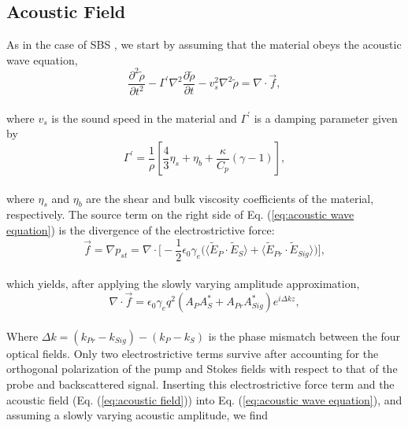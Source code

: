 \documentclass[%
  reprint,
  superscriptaddress,
  amsmath,amssymb,
  aps,
  prapplied,
]{revtex4-2}
\begin{document}
\subsection{Acoustic Field}
\label{Coupled-Wave Equations:Acoustic Field}

As in the case of SBS \cite{boyd2020nonlinear}, we start by assuming that the material obeys the acoustic wave equation,
\\
\begin{equation}
    \frac{\partial^{2}\tilde{\rho}}{\partial t^{2}} - \Gamma^{\prime}\nabla^{2}\frac{\partial\tilde{\rho}}{\partial t} - v_{s}^{2}\nabla^{2}\tilde{\rho} = \nabla\cdot\vec{f},
    \label{eq:acoustic wave equation}
\end{equation}
\\
\noindent where $v_{s}$ is the sound speed in the material and $\Gamma^{\prime}$ is a damping parameter given by
\\
\begin{equation}
    \Gamma^{\prime} = \frac{1}{\rho}\left[\frac{4}{3}\eta_{s} + \eta_{b} + \frac{\kappa}{C_{p}}(\gamma - 1)\right],
\end{equation}
\\
\noindent where $\eta_{s}$ and $\eta_{b}$ are the shear and bulk viscosity coefficients of the material, respectively. The source term on the right side of Eq. (\ref{eq:acoustic wave equation}) is the divergence of the electrostrictive force:
\\
\begin{equation}
    \vec{f} = \nabla p_{st} = \nabla \cdot \Bigg[-\frac{1}{2}\epsilon_{0}\gamma_{e}\Big(\langle\tilde{E}_{P} \cdot \tilde{E}_{S}\rangle + \langle\tilde{E}_{Pr} \cdot \tilde{E}_{Sig}\rangle\Big)\Bigg],
\end{equation}
\\
which yields, after applying the slowly varying amplitude approximation,
\\
\begin{equation}
    \nabla\cdot\vec{f} = \epsilon_{0}\gamma_{e}q^{2}(A_{P}A_{S}^{*} + A_{Pr}A_{Sig}^{*})e^{i\Delta kz},
\end{equation}
\\
Where $\Delta k = (k_{Pr} - k_{Sig}) - (k_{P} - k_{S})$ is the phase mismatch between the four optical fields. Only two electrostrictive terms survive after accounting for the orthogonal polarization of the pump and Stokes fields with respect to that of the probe and backscattered signal. Inserting this electrostrictive force term and the acoustic field (Eq. (\ref{eq:acoustic field})) into Eq. (\ref{eq:acoustic wave equation}), and assuming a slowly varying acoustic amplitude, we find
\end{document}
